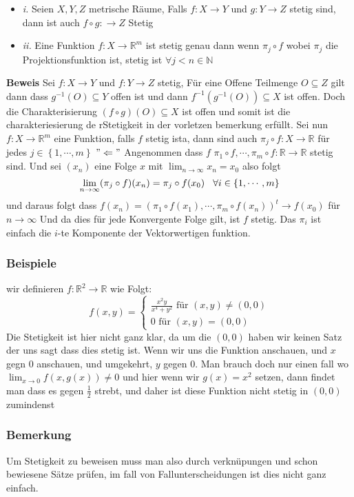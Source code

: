 \documentclass{article}
\newcommand{\smspc}{\hspace{0.3cm}}
\newcommand{\beispiel}[1]{\subsubsection*{Beispiele {#1}}}
\newcommand{\bemerkung}[1]{\subsubsection*{Bemerkung {#1}}}
\begin{document}
\begin{itemize}
  \item{\textit{i.} Seien $X,Y,Z$ metrische Räume, Falls $f:X\rightarrow Y$ und $g:Y\rightarrow Z$ stetig sind, dann ist auch $f\circ g:\rightarrow Z$ Stetig}
  \item{\textit{ii.} Eine Funktion $f:X\rightarrow \mathbb{R}^m$ ist stetig genau dann wenn $\pi_j\circ f$ wobei $\pi_j$ die Projektionsfunktion ist, stetig ist $\forall j<n\in \mathbb{N}$}
\end{itemize}
\textbf{Beweis} Sei $f:X\rightarrow Y$ und $f:Y\rightarrow Z$ stetig, Für eine Offene Teilmenge $O\subseteq Z$ gilt dann dass $g^{-1}(O)\subseteq Y$ offen ist und dann $f^{-1}(g^{-1}(O))\subseteq X$ ist offen. Doch die Charakterisierung $(f\circ g)(O)\subseteq X$ ist offen und somit ist die charakteriesierung de rStetigkeit in der vorletzen bemerkung erfüllt.
\newline Sei nun $f:X\rightarrow \mathbb{R}^m$ eine Funktion, falls $f$ stetig ista, dann sind auch $\pi_j\circ f:X\rightarrow \mathbb{R}$ für jedes $j\in \left\lbrace 1,\cdots,m\right\rbrace$
\newline $"\Leftarrow"$ Angenommen dass $f$ $\pi_1\circ f,\cdots, \pi_m\circ f:\mathbb{R}\rightarrow \mathbb{R}$ stetig sind. Und sei $(x_n)$ eine Folge $x$ mit $\lim_{n \rightarrow\infty}x_n=x_0$ also folgt \[\lim_{n \rightarrow \infty}(\pi_j\circ f)(x_n)=\pi_j\circ f(x_0)\smspc \forall i\in \lbrace1,\cdots,m\rbrace\]
und daraus folgt dass $f(x_n)=\left(\pi_1 \circ f(x_1),\cdots ,\pi_m \circ f(x_n)\right)^t \rightarrow f(x_0)$ für $n \rightarrow \infty$ Und da dies für jede Konvergente Folge gilt, ist $f$ stetig.
\newline Das $\pi_i$ ist einfach die $i$-te Komponente der Vektorwertigen funktion.
\beispiel{} wir definieren $f:\mathbb{R}^2\rightarrow \mathbb{R}$ wie Folgt:
\[f(x,y)=\left\lbrace\begin{matrix}\frac{x^2y}{x^4+y^2}\text{ für }(x,y)\neq (0,0)\\0 \text{ für } (x,y)=(0,0)\end{matrix}\right.\]
Die Stetigkeit ist hier nicht ganz klar, da um die $(0,0)$ haben wir keinen Satz der uns sagt dass dies stetig ist. Wenn wir uns die Funktion anschauen, und $x$ gegn $0$ anschauen, und umgekehrt, $y$ gegen 0. Man brauch doch nur einen fall wo $\lim_{x \rightarrow 0}f(x,g(x))\neq 0$ und hier wenn wir $g(x)=x^2$ setzen, dann findet man dass es gegen $\frac{1}{2}$ strebt, und daher ist diese Funktion nicht stetig in $(0,0)$ zumindenst 
\bemerkung{} Um Stetigkeit zu beweisen muss man also durch verknüpungen und schon bewiesene Sätze prüfen, im fall von Fallunterscheidungen ist dies nicht ganz einfach.
\end{document}
